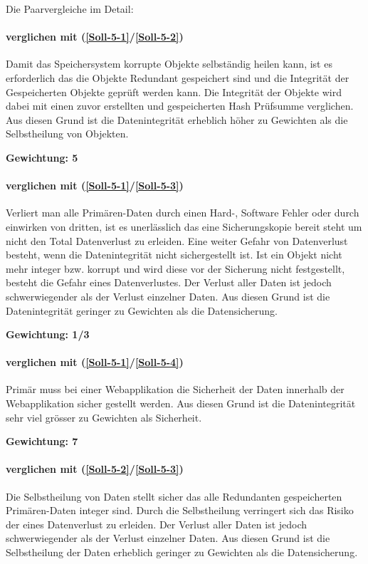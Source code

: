 Die Paarvergleiche im Detail:


\paragraph*{ verglichen mit  (\ref{Soll-5-1}/\ref{Soll-5-2})}
Damit das Speichersystem korrupte Objekte selbständig heilen kann, ist es erforderlich das die Objekte Redundant gespeichert sind und die Integrität der Gespeicherten Objekte geprüft werden kann. Die Integrität der Objekte wird dabei mit einen zuvor erstellten und gespeicherten Hash Prüfsumme verglichen. Aus diesen Grund ist die Datenintegrität erheblich höher zu Gewichten als die Selbstheilung von Objekten.

\textbf{Gewichtung: 5}

\paragraph*{ verglichen mit  (\ref{Soll-5-1}/\ref{Soll-5-3})}
Verliert man alle \gls{Primären-Daten} durch einen Hard-, Software Fehler oder durch einwirken von dritten, ist es unerlässlich das eine Sicherungskopie bereit steht um nicht den Total Datenverlust zu erleiden.
Eine weiter Gefahr von Datenverlust besteht, wenn die Datenintegrität nicht sichergestellt ist. Ist ein Objekt nicht mehr integer bzw. korrupt und wird diese vor der Sicherung nicht festgestellt, besteht die Gefahr eines Datenverlustes.
Der Verlust aller Daten ist jedoch schwerwiegender als der Verlust einzelner Daten.
Aus diesen Grund ist die Datenintegrität geringer zu Gewichten als die Datensicherung.

\textbf{Gewichtung: 1/3}

\paragraph*{ verglichen mit  (\ref{Soll-5-1}/\ref{Soll-5-4})}
Primär muss bei einer Webapplikation die Sicherheit der Daten innerhalb der Webapplikation sicher gestellt werden. Aus diesen Grund ist die Datenintegrität sehr viel grösser zu Gewichten als Sicherheit.

\textbf{Gewichtung: 7}

\paragraph*{ verglichen mit  (\ref{Soll-5-2}/\ref{Soll-5-3})}
Die Selbstheilung von Daten stellt sicher das alle Redundanten gespeicherten \gls{Primären-Daten} integer sind. Durch die Selbstheilung verringert sich das Risiko der eines Datenverlust zu erleiden. 
Der Verlust aller Daten ist jedoch schwerwiegender als der Verlust einzelner Daten.
Aus diesen Grund ist die Selbstheilung der Daten erheblich geringer zu Gewichten als die Datensicherung.


